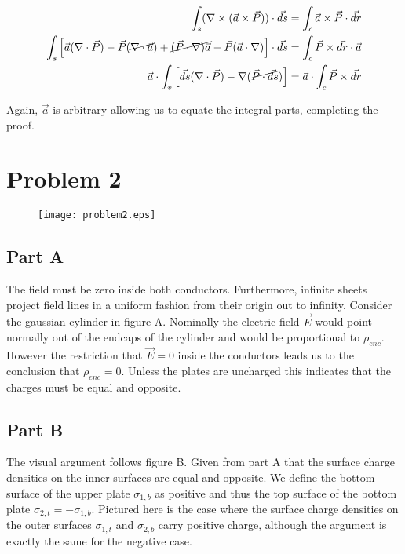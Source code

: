 \documentclass[paper=a4, fontsize=11pt]{scrartcl} %
\numberwithin{equation}{section} %
\numberwithin{figure}{section} %
\numberwithin{table}{section} %
\begin{document}
\begin{align}
\int_s (\nabla \times (\vec{a} \times \vec{P}))\cdot \vec{ds} &= \int_c \vec{a} \times \vec{P} \cdot \vec{dr} \\
\int_s \left[\vec{a}(\nabla \cdot \vec{P}) - \vec{P}(\cancel{\nabla \cdot \vec{a}}) + \cancel{(\vec{P} \cdot \nabla)\vec{a}} - \vec{P}(\vec{a} \cdot \nabla)\right]\cdot \vec{ds} &= \int_c \vec{P} \times \vec{dr} \cdot \vec{a} \\
\vec{a} \cdot \int_v \left[\vec{ds}(\nabla \cdot \vec{P}) - \nabla ( \cancel{\vec{P} \cdot \vec{ds}})\right] &= \vec{a} \cdot \int_c \vec{P}\times \vec{dr} \\
\end{align}

Again, $\vec{a}$ is arbitrary allowing us to equate the integral parts, completing the proof.

\section{Problem 2}

\begin{figure}[H]
\begin{center}
\texttt{[image: problem2.eps]}
\end{center}
\end{figure}

\subsection{Part A}
The field must be zero inside both conductors. Furthermore, infinite sheets project field lines in a uniform fashion from their origin out to infinity. Consider the gaussian cylinder in figure A. Nominally the electric field $\vec{E}$ would point normally out of the endcaps of the cylinder and would be proportional to $\rho_{enc}$. However the restriction that $\vec{E} = 0$ inside the conductors leads us to the conclusion that $\rho_{enc} = 0$. Unless the plates are uncharged this indicates that the charges must be equal and opposite.  
\subsection{Part B}
The visual argument follows figure B. Given from part A that the surface charge densities on the inner surfaces are equal and opposite. We define the bottom surface of the upper plate $\sigma_{1,b}$ as positive and thus the top surface of the bottom plate $\sigma_{2,t} = -\sigma_{1,b}$. Pictured here is the case where the surface charge densities on the outer surfaces $\sigma_{1,t}$ and $\sigma_{2,b}$ carry positive charge, although the argument is exactly the same for the negative case. 
\end{document}

